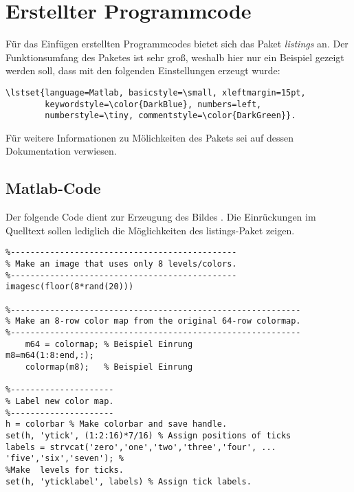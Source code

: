 
\chapter[Erstellter Programmcode]{Erstellter Programmcode}
%
Für das Einfügen erstellten Programmcodes bietet sich das Paket \textsl{listings} an. Der Funktionsumfang des Paketes ist sehr groß, weshalb hier nur ein Beispiel gezeigt werden soll, dass mit den folgenden Einstellungen erzeugt wurde:
{
\begin{lstlisting}
\lstset{language=Matlab, basicstyle=\small, xleftmargin=15pt,
        keywordstyle=\color{DarkBlue}, numbers=left, 
        numberstyle=\tiny, commentstyle=\color{DarkGreen}}.
\end{lstlisting}}
%
Für weitere Informationen zu Mölichkeiten des Pakets sei auf dessen Dokumentation verwiesen.
\section{Matlab-Code}
%
Der folgende Code dient zur Erzeugung des Bildes . Die Einrückungen im Quelltext sollen lediglich die Möglichkeiten des listings-Paket zeigen.

\begin{lstlisting}
%----------------------------------------------
% Make an image that uses only 8 levels/colors.
%----------------------------------------------
imagesc(floor(8*rand(20)))

%-----------------------------------------------------------
% Make an 8-row color map from the original 64-row colormap.
%-----------------------------------------------------------
	m64 = colormap; % Beispiel Einrung
m8=m64(1:8:end,:);
	colormap(m8);   % Beispiel Einrung

%---------------------
% Label new color map.
%---------------------
h = colorbar % Make colorbar and save handle.
set(h, 'ytick', (1:2:16)*7/16) % Assign positions of ticks
labels = strvcat('zero','one','two','three','four', ...
'five','six','seven'); %
%Make  levels for ticks.
set(h, 'yticklabel', labels) % Assign tick labels.
\end{lstlisting}

